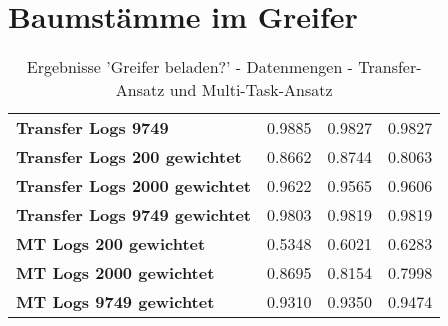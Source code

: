 \chapter{Baumstämme im Greifer}
\label{appendix:BaumstammImGreifer}

	\begin{table}[ht]
	\centering
	\begin{tabularx}{\textwidth}{llll}
	\rowcolor{Gray}	\textbf{Transfer Logs 9749} 			& 0.9885 & 0.9827 & 0.9827	\\ 
		\textbf{Transfer Logs 200 gewichtet}	& 0.8662 & 0.8744 & 0.8063 	\\		
		\textbf{Transfer Logs 2000 gewichtet}	& 0.9622 & 0.9565 & 0.9606  \\	
		\textbf{Transfer Logs 9749 gewichtet}	& 0.9803 & 0.9819 & 0.9819	\\	
		\textbf{MT Logs 200 gewichtet}	 	    & 0.5348 & 0.6021 & 0.6283 	\\		
		\textbf{MT Logs 2000 gewichtet}	 	    & 0.8695 & 0.8154 & 0.7998 	\\	
		\textbf{MT Logs 9749 gewichtet}	 	    & 0.9310 & 0.9350 & 0.9474  \\	
	\end{tabularx}
	\caption{Ergebnisse 'Greifer beladen?' - Datenmengen - Transfer-Ansatz und Multi-Task-Ansatz}
	\label{table:Ergebnisse_Transfer_Logs}
\end{table}